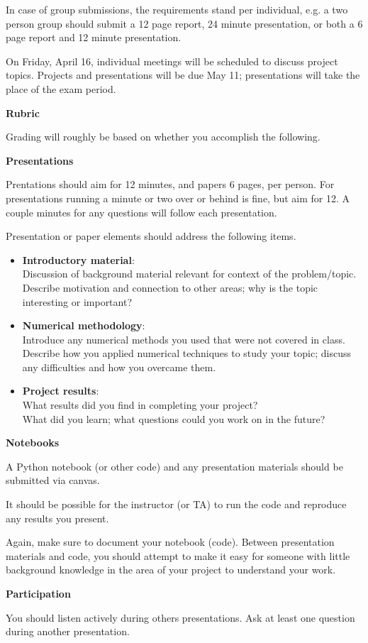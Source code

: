\documentclass[]{homework}
\begin{document}
In case of group submissions, the requirements stand per individual, e.g. a two person group should submit a 12 page report, 24 minute presentation, or both a 6 page report and 12 minute presentation.

On Friday, April 16, individual meetings will be scheduled to discuss project topics.
Projects and presentations will be due May 11; presentations will take the place of the exam period.

\clearpage

\LARGE
{\bf Rubric}

\normalsize
Grading will roughly be based on whether you accomplish the following.

\large
{\bf Presentations}

\normalsize
Prentations should aim for 12 minutes, and papers 6 pages, per person.
For presentations running a minute or two over or behind is fine, but aim for 12.
A couple minutes for any questions will follow each presentation.

Presentation or paper elements should address the following items.

\begin{itemize}
  \item {\bf Introductory material}:\\
  Discussion of background material relevant for context of the problem/topic.\\
  Describe motivation and connection to other areas; why is the topic interesting or important?

  \item {\bf Numerical methodology}:\\
  Introduce any numerical methods you used that were not covered in class.\\
  Describe how you applied numerical techniques to study your topic; discuss any difficulties
  and how you overcame them.

  \item {\bf Project results}:\\
  What results did you find in completing your project?\\
  What did you learn; what questions could you work on in the future?

\end{itemize}

\large
{\bf Notebooks}

\normalsize
A Python notebook (or other code) and any presentation materials should be submitted via canvas.

It should be possible for the instructor (or TA) to run the code and reproduce any results you present.

Again, make sure to document your notebook (code). Between presentation materials and
code, you should attempt to make it easy for someone with little background knowledge in the
area of your project to understand your work.

\large
{\bf Participation}

\normalsize
You should listen actively during others presentations.
Ask at least one question during another presentation.
\end{document}
